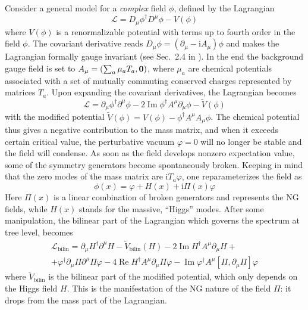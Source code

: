 \documentclass[final,3p,times,12pt,a4paper,sort&compress]{elsarticle}
\newcommand\Lag{\mathscr{L}}                %
\newcommand\vek[1]{{\boldsymbol{\bf #1}}}   %
\newcommand\he[1]{#1^{\dagger}}             %
\newcommand\imag{\mathrm i}                 %
\newcommand\de{\partial}
\newcommand\vp{\varphi}
\DeclareMathOperator{\re}{Re}               %
\DeclareMathOperator{\im}{Im}               %
\begin{document}
Consider a general model for a \emph{complex} field $\phi$, defined by the
Lagrangian \cite{Brauner:2005di}
\begin{equation}
\Lag=\he{D_\mu\phi}D^\mu\phi-V(\phi)
\end{equation}
where $V(\phi)$ is a renormalizable potential with terms up to fourth order in
the field $\phi$. The covariant derivative reads $D_\mu\phi=(\de_\mu-\imag
A_\mu)\phi$ and makes the Lagrangian formally gauge invariant
(see Sec.~2.4 in \cite{Kapusta:2006kg}). In the end the background gauge field
is set to $A_\mu=(\sum_a\mu_aT_a,\vek0)$, where $\mu_a$ are chemical potentials
associated with a set of mutually commuting conserved charges represented by
matrices $T_a$. Upon expanding the covariant derivatives, the Lagrangian becomes
\begin{equation}
\Lag=\de_\mu\he\phi\de^\mu\phi-2\im\he\phi A^\mu\de_\mu\phi-\tilde V(\phi)
\end{equation}
with the modified potential $\tilde V(\phi)=V(\phi)-\he\phi A^\mu A_\mu\phi$.
The chemical potential thus gives a negative contribution to the mass matrix,
and when it exceeds certain critical value, the perturbative vacuum $\vp=0$
will no longer be stable and the field will condense. As soon as the field
develops nonzero expectation value, some of the symmetry generators
become spontaneously broken. Keeping in mind that the zero modes of the mass
matrix are $\imag T_a\vp$, one reparameterizes the field as
\begin{equation}
\phi(x)=\vp+H(x)+\imag\Pi(x)\vp
\end{equation}
Here $\Pi(x)$ is a linear combination of broken generators and represents
the NG fields, while $H(x)$ stands for the massive, ``Higgs'' modes. After some
manipulation, the bilinear part of the Lagrangian which governs the spectrum at
tree level, becomes
\begin{multline}
\Lag_{\text{bilin}}=\de_\mu\he H\de^\mu H-\tilde V_{\text{bilin}}(H)-
2\im\he HA^\mu\de_\mu H+\\
+\he\vp\de_\mu\Pi\de^\mu\Pi\vp-4\re\he HA^\mu\de_\mu\Pi\vp
-\im\he\vp A^\mu[\Pi,\de_\mu\Pi]\vp
\label{Lbilin}
\end{multline}
where $\tilde V_{\text{bilin}}$ is the bilinear part of the modified potential,
which only depends on the Higgs field $H$. This is the manifestation of the NG
nature of the field $\Pi$: it drops from the mass part of the Lagrangian.
\end{document}
